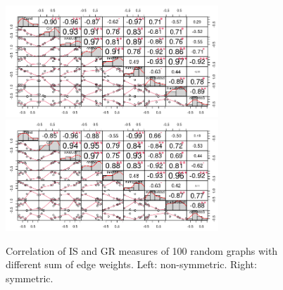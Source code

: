 \documentclass{article}
\begin{document}
\begin{figure}[htbp!]
  \centering{}
  \includegraphics[width=8cm]{img/corrISGR100NonCW}\quad\quad
  \includegraphics[width=8cm]{img/corrISGRS100NonCW}
  \caption{Correlation of IS and GR measures of 100 random graphs with
  different sum of edge weights. Left: non-symmetric. Right: symmetric.}
  \label{fig:corr100nonCW}
\end{figure}
\end{document}
